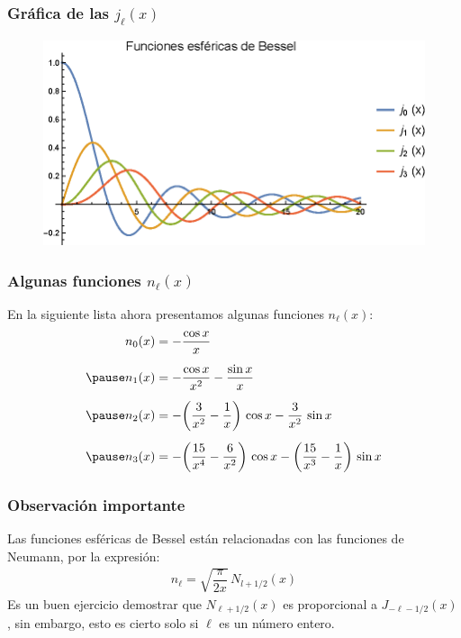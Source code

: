 \documentclass[12pt]{beamer}
\begin{document}
\begin{frame}
\frametitle{Gráfica de las $j_{\ell} (x)$}
\begin{figure}[H]
    \centering
    \includegraphics[scale=1]{Imagenes/Plot_Esfericas_Bessel.eps}
\end{figure}
\end{frame}
\begin{frame}
\frametitle{Algunas funciones $n_{\ell} (x)$}
En la siguiente lista ahora presentamos algunas funciones $n_{\ell} (x)$:
\pause
\begin{eqnarray*}
\begin{aligned}
n_{0} (x) &= - \dfrac{\cos x}{x} \\[0.5em] \pause 
n_{1} (x) &= - \dfrac{\cos x}{x^{2}} - \dfrac{\sin x}{x} \\[0.5em] \pause 
n_{2} (x) &= - \bigg( \dfrac{3}{x^{2}} - \dfrac{1}{x} \bigg) \, \cos x - \dfrac{3}{x^{2}} \, \sin x \\[0.5em] \pause 
n_{3} (x) &= - \bigg( \dfrac{15}{x^{4}} - \dfrac{6}{x^{2}} \bigg) \, \cos x - \bigg( \dfrac{15}{x^{3}} - \dfrac{1}{x} \bigg) \, \sin x
\end{aligned}
\end{eqnarray*}
\end{frame}
\begin{frame}
\frametitle{Observación importante}
Las funciones esféricas de Bessel están relacionadas con las funciones de Neumann, por la expresión:
\pause
\begin{align*}
n_{\ell} = \sqrt{\dfrac{\pi}{2 x}} \, N_{l+1/2} (x)
\end{align*}
Es un buen ejercicio demostrar que $N_{\ell+1/2} (x)$ es proporcional a $J_{-\ell-1/2} (x)$, \pause sin embargo, esto es cierto solo si $\ell$ es un número entero.
\end{frame}
\end{document}
